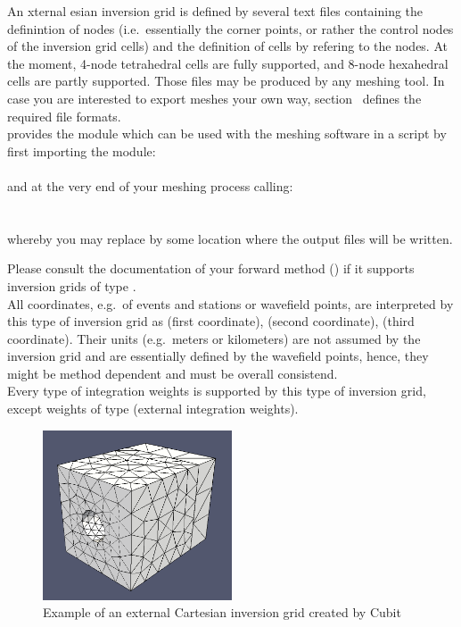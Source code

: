 An xternal esian inversion grid is defined by several text files containing the definintion 
of nodes (i.e.\  essentially the corner points, or rather the control nodes of the inversion grid cells) and the 
definition of cells by refering to the nodes. At the moment, 4-node tetrahedral cells are fully supported, and 8-node 
hexahedral cells are partly supported. 
Those files may be produced by any meshing tool. In case you are interested to export meshes your own way, 
section~ defines the required file formats.\\
\ASKI provides the  module  which can be used with the 
meshing software  in a  script by first importing the module:\\
\\
and at the very end of your meshing process calling:\\
\\
\\
whereby you may replace  by some location where the output files will be written.

Please consult the documentation of your forward method () if it supports
inversion grids of type . \\
All coordinates, e.g.\ of events and stations or wavefield points, are interpreted by this type of inversion grid as
 (first coordinate),  (second coordinate),  (third coordinate). Their
units (e.g.\ meters or kilometers) are not assumed by the inversion grid and are essentially defined by the wavefield
points, hence, they might be method dependent and must be overall consistend.\\
Every type of integration weights is supported by this type of inversion grid, except weights of type 
 (external integration weights).

\begin{figure}[ht]
  \centering
  \includegraphics[width=0.5\textwidth]{images/ecartInversionGrid_manual.png}
  \caption{Example of an external Cartesian inversion grid created by Cubit}
  \label{basic_steps,sec:invgrid,sub:ecart,fig:grid}
\end{figure}

